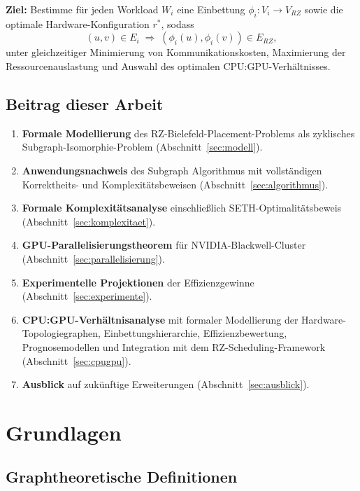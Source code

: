 ﻿\documentclass[a4paper,12pt]{article}
\theoremstyle{definition}
\begin{document}
\textbf{Ziel:} Bestimme f\"{u}r jeden Workload $W_i$ eine Einbettung $\phi_i: V_i \to V_{RZ}$ sowie die optimale Hardware-Konfiguration $r^*$, sodass
\[
  (u, v) \in E_i \;\Rightarrow\; (\phi_i(u), \phi_i(v)) \in E_{RZ},
\]
unter gleichzeitiger Minimierung von Kommunikationskosten, Maximierung der Ressourcenauslastung und Auswahl des optimalen CPU:GPU-Verh\"{a}ltnisses.

\subsection{Beitrag dieser Arbeit}

\begin{enumerate}
  \item \textbf{Formale Modellierung} des RZ-Bielefeld-Placement-Problems als zyklisches Subgraph-Isomorphie-Problem (Abschnitt~\ref{sec:modell}).
  \item \textbf{Anwendungsnachweis} des Subgraph Algorithmus mit vollst\"{a}ndigen Korrektheits- und Komplexit\"{a}tsbeweisen (Abschnitt~\ref{sec:algorithmus}).
  \item \textbf{Formale Komplexit\"{a}tsanalyse} einschlie{\ss}lich SETH-Optimalit\"{a}tsbeweis (Abschnitt~\ref{sec:komplexitaet}).
  \item \textbf{GPU-Parallelisierungstheorem} f\"{u}r NVIDIA-Blackwell-Cluster (Abschnitt~\ref{sec:parallelisierung}).
  \item \textbf{Experimentelle Projektionen} der Effizienzgewinne (Abschnitt~\ref{sec:experimente}).
  \item \textbf{CPU:GPU-Verh\"{a}ltnisanalyse} mit formaler Modellierung der Hardware-Topologiegraphen, Einbettungshierarchie, Effizienzbewertung, Prognosemodellen und Integration mit dem RZ-Scheduling-Framework (Abschnitt~\ref{sec:cpugpu}).
  \item \textbf{Ausblick} auf zuk\"{u}nftige Erweiterungen (Abschnitt~\ref{sec:ausblick}).
\end{enumerate}

\section{Grundlagen}
\label{sec:grundlagen}

\subsection{Graphtheoretische Definitionen}
\end{document}
